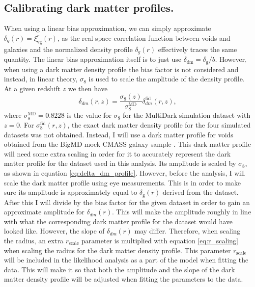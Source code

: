 \subsection{Calibrating dark matter profiles.}\label{sec:dm_calibrate}
When using a linear bias approximation, we can simply approximate $\delta_g(r)=\xi_{\mathrm{vg}}^r(r)$, as the real space correlation function between voids and galaxies and the normalized density profile $\delta_g(r)$ effectively traces the same quantity. The linear bias approximation itself is to just use $\delta_{\mathrm{dm}}=\delta_\mathrm{g}/b$. However, when using a dark matter density profile the bias factor is not considered and instead, in linear theory, $\sigma_8$ is used to scale the amplitude of the density profile. At a given redshift $z$ we then have
\begin{equation}\label{eq:delta_dm_profile}
    \delta_{dm}(r,z) = \frac{\sigma_8(z)}{\sigma_8^{\mathrm{MD}}}\delta_{dm}^\mathrm{fid}(r,z),
\end{equation}
where $\sigma_8^{\mathrm{MD}}=0.8228$ is the value for $\sigma_8$ for the MultiDark simulation dataset with $z=0$. For $\sigma_8^\mathrm{fid}(r,z)$, the exact dark matter density profile for the four simulated datasets was not obtained. Instead, I will use a dark matter profile for voids obtained from the BigMD mock CMASS galaxy sample \cite{Dawson_2012}. This dark matter profile will need some extra scaling in order for it to accurately represent the dark matter profile for the dataset used in this analysis. Its amplitude is scaled by $\sigma_8$, as shown in equation \ref{eq:delta_dm_profile}. However, before the analysis, I will scale the dark matter profile using eye measurements. This is in order to make sure its amplitude is approximately equal to $\delta_\mathrm{g}(r)$ derived from the dataset.  After this I will divide by the bias factor for the given dataset in order to gain an approximate amplitude for $\delta_{dm}(r)$. This will make the amplitude roughly in line with what the corresponding dark matter profile for the dataset would have looked like. However, the slope of $\delta_{dm}(r)$ may differ. Therefore, when scaling the radius, an extra $r_\mathrm{scale}$ parameter is multiplied with equation \ref{eq:r_scaling} when scaling the radius for the dark matter density profile. This parameter $r_\mathrm{scale}$ will be included in the likelihood analysis as a part of the model when fitting the data. This will make it so that both the amplitude and the slope of the dark matter density profile will be adjusted when fitting the parameters to the data.
